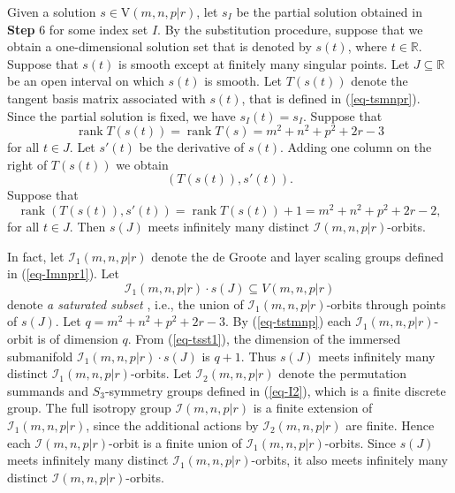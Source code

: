 \documentclass[reqno]{amsart}
\theoremstyle{definition}
\numberwithin{equation}{section}
\theoremstyle{remark}
\begin{document}
Given a solution $s\in \mathrm{V}(m,n,p|r)$, let $s_I$ be the partial solution obtained in \textbf{Step} 6 for some index set $I$.
By the substitution procedure, suppose that we obtain a one-dimensional solution set that is denoted by  $s(t)$, where $t\in \mathbb{R}$. Suppose that $s(t)$ is smooth except at finitely many singular points. Let $J\subseteq \mathbb{R}$ be an open interval on which $s(t)$ is smooth. 
Let $T(s(t))$ denote the tangent basis matrix associated with $s(t)$, that is defined in (\ref{eq-tsmnpr}). Since the partial solution is fixed, we have $s_I(t)=s_I$.
Suppose that 
\begin{equation}\label{eq-tstmnp}
\operatorname{rank}T(s(t))=\operatorname{rank}T(s)=m^2+n^2+p^2+2r-3
\end{equation}
for all $t\in J$.
Let $s'(t)$ be the derivative of $s(t)$. Adding one column on the right of $T(s(t))$ we obtain
$$\left(T(s(t)),s'(t)\right).$$
Suppose that
\begin{equation}\label{eq-tsst1}
\operatorname{rank}\left(T(s(t)),s'(t)\right)=\operatorname{rank}T(s(t))+1=m^2+n^2+p^2+2r-2,
\end{equation}
for all $t\in J$.    
Then $s(J)$ meets infinitely many distinct $\mathcal{I}(m,n,p|r)$-orbits. 

In fact, let $\mathcal{I}_1(m,n,p|r)$ denote the de Groote and layer scaling groups defined in (\ref{eq-Imnpr1}). Let
\begin{equation*}
\mathcal{I}_1(m,n,p|r)\cdot s(J)\subseteq V(m,n,p|r)
\end{equation*}
denote \emph{a saturated subset} \cite{lee12smooth}, i.e., the union of  $\mathcal{I}_1(m,n,p|r)$-orbits through points of $s(J)$. Let $q=m^2+n^2+p^2+2r-3$. By (\ref{eq-tstmnp}) each $\mathcal{I}_1(m,n,p|r)$-orbit is of dimension $q$. From (\ref{eq-tsst1}), the dimension of the immersed submanifold $\mathcal{I}_1(m,n,p|r)\cdot s(J)$ is $q+1$. Thus $s(J)$ meets infinitely many distinct $\mathcal{I}_1(m,n,p|r)$-orbits. Let $\mathcal{I}_2(m,n,p|r)$ denote the permutation summands and $S_3$-symmetry groups defined in (\ref{eq-I2}), which is a finite discrete group. The full isotropy group $\mathcal{I}(m,n,p|r)$ is a finite extension of $\mathcal{I}_1(m,n,p|r)$, since the additional actions by $\mathcal{I}_2(m,n,p|r)$ are finite. Hence each $\mathcal{I}(m,n,p|r)$-orbit is a finite union of $\mathcal{I}_1(m,n,p|r)$-orbits. Since $s(J)$ meets infinitely many distinct $\mathcal{I}_1(m,n,p|r)$-orbits, it also meets infinitely many distinct $\mathcal{I}(m,n,p|r)$-orbits. 
\end{document}
